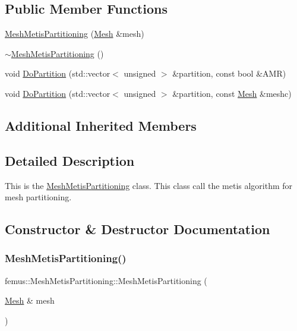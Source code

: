 \subsection*{Public Member Functions}
\begin{DoxyCompactItemize}
\item 
\mbox{\hyperlink{classfemus_1_1_mesh_metis_partitioning_a8ba10e13ea7454c23e9ecf37b3e1bb1e}{Mesh\+Metis\+Partitioning}} (\mbox{\hyperlink{classfemus_1_1_mesh}{Mesh}} \&mesh)
\item 
\mbox{\hyperlink{classfemus_1_1_mesh_metis_partitioning_a5ef364b643050ce8582fab42efe02def}{$\sim$\+Mesh\+Metis\+Partitioning}} ()
\item 
void \mbox{\hyperlink{classfemus_1_1_mesh_metis_partitioning_a850b53ad26d915ac593f07fc871a1ca9}{Do\+Partition}} (std\+::vector$<$ unsigned $>$ \&partition, const bool \&A\+MR)
\item 
void \mbox{\hyperlink{classfemus_1_1_mesh_metis_partitioning_ab0ca01f234c9a1b57082365d5bb6b1aa}{Do\+Partition}} (std\+::vector$<$ unsigned $>$ \&partition, const \mbox{\hyperlink{classfemus_1_1_mesh}{Mesh}} \&meshc)
\end{DoxyCompactItemize}
\subsection*{Additional Inherited Members}


\subsection{Detailed Description}
This is the {\ttfamily \mbox{\hyperlink{classfemus_1_1_mesh_metis_partitioning}{Mesh\+Metis\+Partitioning}}} class. This class call the metis algorithm for mesh partitioning. 

\subsection{Constructor \& Destructor Documentation}
\mbox{\label{classfemus_1_1_mesh_metis_partitioning_a8ba10e13ea7454c23e9ecf37b3e1bb1e}} 
\subsubsection{\texorpdfstring{Mesh\+Metis\+Partitioning()}{MeshMetisPartitioning()}}
{\footnotesize\ttfamily femus\+::\+Mesh\+Metis\+Partitioning\+::\+Mesh\+Metis\+Partitioning (\begin{DoxyParamCaption}\item[{\mbox{\hyperlink{classfemus_1_1_mesh}{Mesh}} \&}]{mesh }\end{DoxyParamCaption})}

